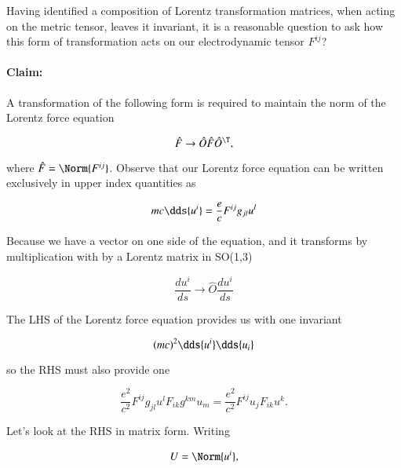 Having identified a composition of Lorentz transformation matrices, when acting on the metric tensor, leaves it invariant, it is a reasonable question to ask how this form of transformation acts on our electrodynamic tensor $F^{i j}$?

\paragraph{Claim:} A transformation of the following form is required to maintain the norm of the Lorentz force equation

\begin{equation}\label{eqn:relativisticElectrodynamicsL11:490}
\hat{F} \rightarrow \hat{O} \hat{F} \hat{O}^\T ,
\end{equation}

where $\hat{F} = \Norm{F^{i j}}$.  Observe that our Lorentz force equation can be written exclusively in upper index quantities as

\begin{equation}\label{eqn:relativisticElectrodynamicsL11:370}
m c \dds{u^i} = \frac{e}{c} F^{i j} g_{j l} u^l
\end{equation}

Because we have a vector on one side of the equation, and it transforms by multiplication with by a Lorentz matrix in SO(1,3)

\begin{equation}\label{eqn:relativisticElectrodynamicsL11:390}
\frac{du^i}{ds} \rightarrow \hat{O} \frac{du^i}{ds} 
\end{equation}

The LHS of the Lorentz force equation provides us with one invariant

\begin{equation}\label{eqn:relativisticElectrodynamicsL11:1090}
(m c)^2 \dds{u^i} \dds{u_i}
\end{equation}

so the RHS must also provide one

\begin{equation}\label{eqn:relativisticElectrodynamicsL11:1110}
\frac{e^2}{c^2} 
F^{i j} g_{j l} u^l
F_{i k} g^{k m} u_m
=
\frac{e^2}{c^2} 
F^{i j} u_j
F_{i k} u^k.
\end{equation}

Let's look at the RHS in matrix form.  Writing

\begin{equation}\label{eqn:relativisticElectrodynamicsL11:1130}
U = \Norm{u^i},
\end{equation}

